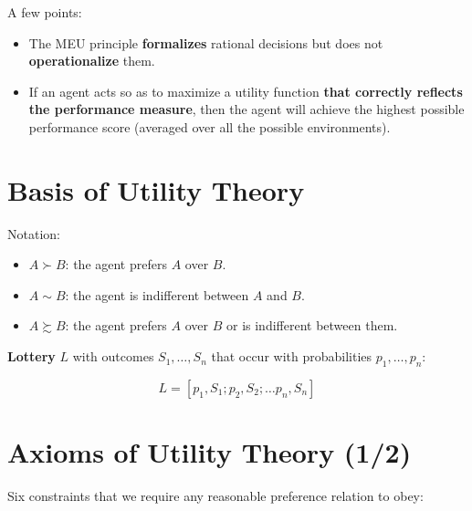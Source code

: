 \documentclass[11pt]{article}
\begin{document}
A few points:

\begin{itemize}
\item The MEU principle \textbf{formalizes} rational decisions but does not \textbf{operationalize} them.

\item If an agent acts so as to maximize a utility function \textbf{that correctly reflects the performance measure}, then the agent will achieve the highest possible performance score (averaged over all the possible environments).
\end{itemize}
\section{Basis of Utility Theory}
\label{sec:org7c5727e}

Notation:

\begin{itemize}
\item \(A \succ B\): the agent prefers \(A\) over \(B\).
\item \(A \sim B\): the agent is indifferent between \(A\) and \(B\).
\item \(A \succsim B\): the agent prefers \(A\) over \(B\) or is indifferent between them.
\end{itemize}

\textbf{Lottery} \(L\) with outcomes \(S_1, \dots, S_n\) that occur with probabilities \(p_1, \dots, p_n\):

\begin{equation*}
L = [p_1, S_1; p_2, S_2; \dots p_n, S_n]
\end{equation*}
\section{Axioms of Utility Theory (1/2)}
\label{sec:orgb3b5f69}

Six constraints that we require any reasonable preference relation to obey:
\end{document}
